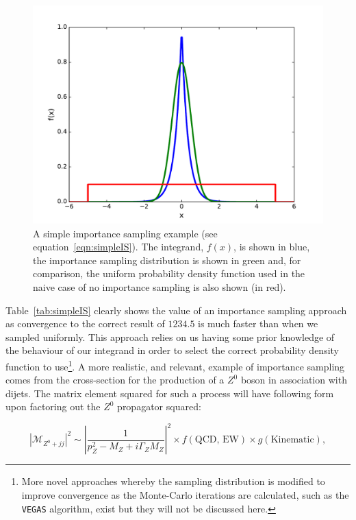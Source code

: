 	\begin{figure}[htp]
		\includegraphics[width=\textwidth]{importanceSampling}
		\caption{A simple importance sampling example (see equation~\ref{eqn:simpleIS}).  The integrand, $f(x)$, is shown in blue,
		the importance sampling distribution is shown in green and, for comparison, the uniform probability density function used
		in the naive case of no importance sampling is also shown (in red).}
		\label{fig:simpleIS}
  	\end{figure}

  	Table~\ref{tab:simpleIS} clearly shows the value of an importance sampling approach as convergence to the correct result of $1234.5$
  	is much faster than when we sampled uniformly. This approach relies on us having some prior knowledge of the behaviour of our
  	integrand in order to select the correct probability density function to use\footnote{More novel approaches whereby the sampling
  	distribution is modified to improve convergence as the Monte-Carlo iterations are calculated, such as the \texttt{VEGAS} algorithm,
  	exist but they will not be discussed here.}. A more realistic, and relevant, example of importance sampling comes from the
  	cross-section for the production of a $Z^0$ boson in association with dijets.  The matrix element squared for such a process
  	will have following form upon factoring out the $Z^0$ propagator squared:

  	\begin{equation}
  		|\mathcal{M}_{Z^0+jj}|^2 \sim \left|\frac{1}{p_Z^2 - M_Z + i\Gamma_ZM_Z}\right|^2\times f(\text{QCD, EW})\times g(\text{Kinematic}),
  		\label{eqn:schematicZ}
  	\end{equation}


